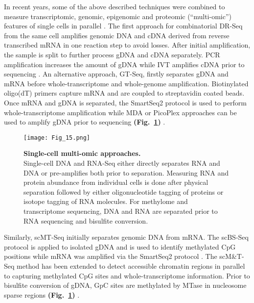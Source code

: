 In recent years, some of the above described techniques were combined to measure transcriptomic, genomic, epigenomic and proteomic (“multi-omic”) features of single cells in parallel \citep{Macaulay2017}. The first approach for combinatorial \gls{DR-Seq} from the same cell amplifies genomic DNA and cDNA derived from reverse transcribed mRNA in one reaction step to avoid losses. After initial amplification, the sample is split to further process \gls{gDNA} and cDNA separately. PCR amplification increases the amount of gDNA while IVT amplifies cDNA prior to sequencing \citep{Dey2015}. An alternative approach, \gls{GT-Seq}, firstly separates gDNA and mRNA before whole-transcriptome and whole-genome amplification. Biotinylated oligo(dT) primers capture mRNA and are coupled to streptavidin coated beads. Once mRNA and gDNA is separated, the SmartSeq2 protocol is used to perform whole-transcriptome amplification while MDA or PicoPlex approaches can be used to amplify gDNA prior to sequencing \textbf{(Fig.~\ref{fig0:multiomics})} \citep{Macaulay2015}.\\

\begin{figure}[!h]
\centering
\texttt{[image: Fig\_15.png]}
\caption[Single-cell multi-omic approaches]{\textbf{Single-cell multi-omic approaches.}\\
Single-cell DNA and RNA-Seq either directly separates RNA and DNA or pre-amplifies both prior to separation. Measuring RNA and protein abundance from individual cells is done after physical separation followed by either oligonucleotide tagging of proteins or isotope tagging of RNA molecules. For methylome and transcriptome sequencing, DNA and RNA are separated prior to RNA sequencing and bisulfite conversion.}
\label{fig0:multiomics}
\end{figure}

Similarly, \gls{scMT-Seq} initially separates genomic DNA from mRNA. The scBS-Seq protocol is applied to isolated gDNA and is used to identify methylated CpG positions while mRNA was amplified via the SmartSeq2 protocol \citep{Angermueller2016a}. The scM\&{}T-Seq method has been extended to detect accessible chromatin regions in parallel to capturing methylated CpG sites and whole-transcriptome information. Prior to bisulfite conversion of gDNA, GpC sites are methylated by MTase in nucleosome sparse regions \textbf{(Fig.~\ref{fig0:multiomics})} \citep{Pott2017, Clark2018}.\\
 
